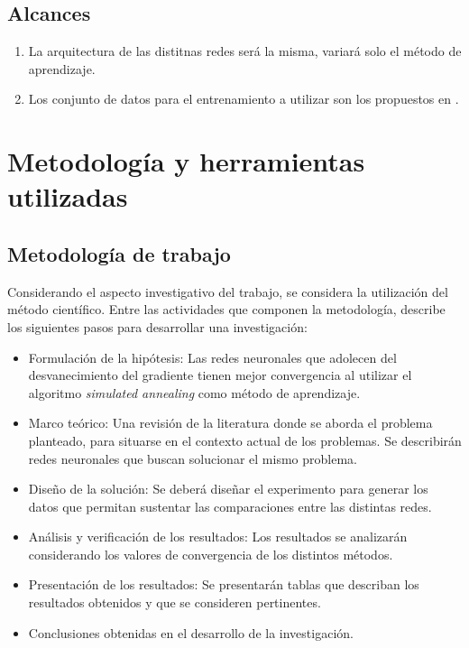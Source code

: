 \subsection{Alcances}
\begin{enumerate}
	\item La arquitectura de las distitnas redes será la misma, variará solo el método de aprendizaje.
	\item Los conjunto de datos para el entrenamiento a utilizar son los propuestos en \cite{Morse2016}.
\end{enumerate}

\section{Metodología y herramientas utilizadas}
\subsection{Metodología de trabajo}
Considerando el aspecto investigativo del trabajo, se considera la utilización del método científico. Entre las actividades que componen la metodología,  describe los siguientes pasos para desarrollar una investigación:

\begin{itemize}
	\item Formulación de la hipótesis: Las redes neuronales que adolecen del desvanecimiento del gradiente tienen mejor convergencia al utilizar el algoritmo {\em simulated annealing} como método de aprendizaje.

	\item Marco teórico: Una revisión de la literatura donde se aborda el problema planteado, para situarse en el contexto actual de los problemas. Se describirán redes neuronales que buscan solucionar el mismo problema.

	\item Diseño de la solución: Se deberá diseñar el experimento para generar los datos que permitan sustentar las comparaciones entre las distintas redes.

	\item Análisis y verificación de los resultados: Los resultados se analizarán considerando los valores de convergencia de los distintos métodos.

	\item Presentación de los resultados: Se presentarán tablas que describan los resultados obtenidos y que se consideren pertinentes.

	\item Conclusiones obtenidas en el desarrollo de la investigación.
\end{itemize}

